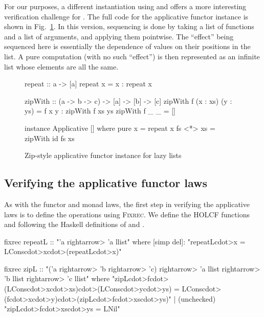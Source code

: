 For our purposes, a different instantiation using  and  offers a more interesting verification challenge for . The full code for the applicative functor instance is shown in Fig.~\ref{fig:case-applicative-list-instance}. In this version, sequencing is done by taking a list of functions and a list of arguments, and applying them pointwise. The ``effect'' being sequenced here is essentially the dependence of values on their positions in the list. A pure computation (with no such ``effect'') is then represented as an infinite list whose elements are all the same.

\begin{figure}
\begin{center}
\begin{minipage}{0.90\textwidth}
\begin{hscode}
repeat :: a -> [a]
repeat x = x : repeat x
\end{hscode}
\begin{hscode}
zipWith :: (a -> b -> c) -> [a] -> [b] -> [c]
zipWith f (x : xs) (y : ys) = f x y : zipWith f xs ys
zipWith f _ _ = []
\end{hscode}
\begin{hscode}
instance Applicative [] where
  pure x = repeat x
  fs <*> xs = zipWith id fs xs
\end{hscode}
\end{minipage}
\end{center}
\caption{Zip-style applicative functor instance for lazy lists}
\label{fig:case-applicative-list-instance}
\end{figure}

\subsection{Verifying the applicative functor laws}
\label{sec:case-verify-applicative}

As with the functor and monad laws, the first step in verifying the applicative laws is to define the operations using \textsc{Fixrec}. We define the HOLCF functions  and  following the Haskell definitions of  and .
%
\begin{isacode}
fixrec repeatL :: "'a \<rightarrow> 'a llist"
  where [simp del]: "repeatL\<cdot>x = LCons\<cdot>x\<cdot>(repeatL\<cdot>x)"
\end{isacode}
\unmedskip
{}
\begin{isacode}
fixrec zipL :: "('a \<rightarrow> 'b \<rightarrow> 'c) \<rightarrow> 'a llist \<rightarrow> 'b llist \<rightarrow> 'c llist"
  where "zipL\<cdot>f\<cdot>(LCons\<cdot>x\<cdot>xs)\<cdot>(LCons\<cdot>y\<cdot>ys) = LCons\<cdot>(f\<cdot>x\<cdot>y)\<cdot>(zipL\<cdot>f\<cdot>xs\<cdot>ys)"
  | (unchecked) "zipL\<cdot>f\<cdot>xs\<cdot>ys = LNil"
\end{isacode}

